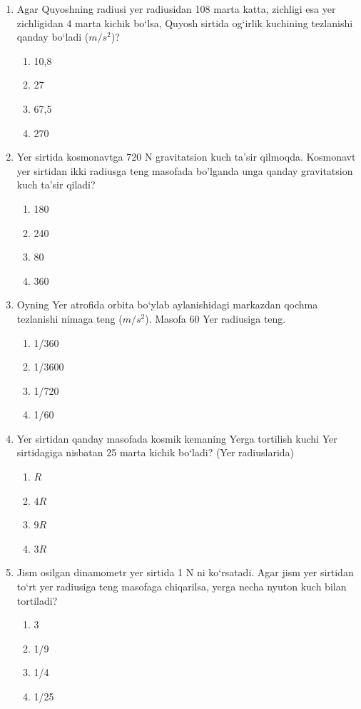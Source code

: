 \begin{enumerate}
\item Agar Quyoshning radiusi yer radiusidan 108 marta katta, zichligi esa yer zichligidan 4 marta kichik bo‘lsa, Quyosh sirtida og‘irlik kuchining tezlanishi qanday bo‘ladi ($m/s^2$)?
\begin{enumerate}[label=\Alph*)]
\item 10,8
\item 27
\item 67,5
\item 270
\end{enumerate}

\item Yer sirtida kosmonavtga 720 N gravitatsion kuch ta’sir qilmoqda. Kosmonavt yer sirtidan ikki radiusga teng masofada bo'lganda unga qanday gravitatsion kuch ta’sir qiladi?
\begin{enumerate}[label=\Alph*)]
\item 180
\item 240
\item 80
\item 360
\end{enumerate}

\item Oyning Yer atrofida orbita bo‘ylab aylanishidagi markazdan qochma tezlanishi nimaga teng ($m/s^2$). Masofa 60 Yer radiusiga teng.
\begin{enumerate}[label=\Alph*)]
\item 1/360
\item 1/3600
\item 1/720
\item 1/60
\end{enumerate}

\item Yer sirtidan qanday masofada kosmik kemaning Yerga tortilish kuchi Yer sirtidagiga nisbatan 25 marta kichik bo‘ladi? (Yer radiuslarida)
\begin{enumerate}[label=\Alph*)]
\item $R$
\item $4 R$
\item $9 R$
\item $3 R$
\end{enumerate}

\item Jism osilgan dinamometr yer sirtida 1 N ni ko‘rsatadi. Agar jism yer sirtidan to‘rt yer radiusiga teng masofaga chiqarilsa, yerga necha nyuton kuch bilan tortiladi?
\begin{enumerate}[label=\Alph*)]
\item 3
\item 1/9
\item 1/4
\item 1/25
\end{enumerate}


\end{enumerate}
